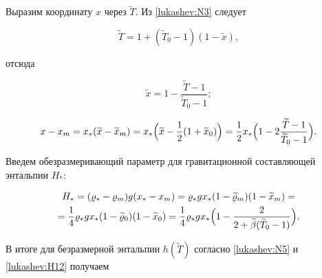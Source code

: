 Выразим координату  $x$ через $\widetilde{T}$. Из \eqref{lukashev:N3} следует

\begin{equation}

\widetilde{T}=1+(\widetilde{T}_0-1)(1-\widetilde{x}),

\end{equation}

отсюда

\begin{equation}

\widetilde{x}=1-\frac{\widetilde{T}-1}{\widetilde{T}_0-1};\label{lukashev:N7}

\end{equation}

\begin{equation}

x-x_m=

x_* (\widetilde{x}-\widetilde{x}_m )=

x_* \Bigl(\widetilde{x}-\frac12 (1+\widetilde{x}_0) \Bigr)=

\frac12x_*\Bigl(

1-2\frac{\widetilde{T}-1}{\widetilde{T}_0-1} \Bigr).

\label{lukashev:x11}

\end{equation}





Введем обезразмеривающий параметр для гравитационной составляющей энтальпии $H_*$:

\begin{multline}

H_*=(\varrho_*-\varrho_m) g (x_*-x_m )=

\varrho_* g x_* (1-\widetilde{\varrho}_m )    (1- \widetilde{x}_m )=

\\

=\frac14 \varrho_* g x_*   (1-\widetilde{\varrho}_0 ) (1- \widetilde{x}_0)

=\frac14 \varrho_* g x_*  \Bigl(1-\frac2{2+\widetilde{\beta}(\widetilde{T}_0-1)}\Bigr).

\label{lukashev:H12}

\end{multline}

В итоге для безразмерной энтальпии $h(\widetilde{T})$ согласно \eqref{lukashev:N5} и \eqref{lukashev:H12} получаем

